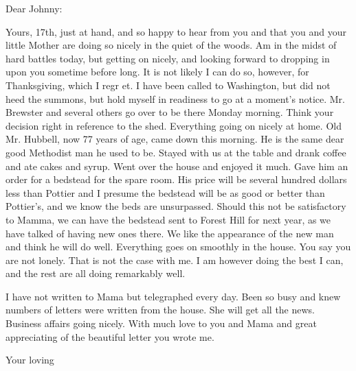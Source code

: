 \documentclass[11pt, oneside]{letter}   	%
\begin{document}
\signature{Father}

\address{26 Broadway \\New York}
\date{November 19, 1887}

\begin{letter}{}%

\opening{Dear Johnny:}
\setlength{\parindent}{0.5cm}

Yours, 17th, just at hand, and so happy to hear from you and that you and your little Mother are doing so nicely in the quiet of the woods. Am in the midst of hard battles today, but getting on nicely, and looking forward to dropping in upon you sometime before long. It is not likely I can do so, however, for Thanksgiving, which I regr et. I have been called to Washington, but did not heed the summons, but hold myself in readiness to go at a moment's notice. Mr. Brewster and several others go over to be there Monday morning. Think your decision right in reference to the shed. Everything going on nicely at home. Old Mr. Hubbell, now 77 years of age, came down this morning. He is the same dear good Methodist man he used to be. Stayed with us at the table and drank coffee and ate cakes and syrup. Went over the house and enjoyed it much. Gave him an order for a bedstead for the spare room. His price will be several hundred dollars less than Pottier and I presume the bedstead will be as good or better than Pottier's, and we know the beds are unsurpassed. Should this not be satisfactory to Mamma, we can have the bedstead sent to Forest Hill for next year, as we have talked of having new ones there. We like the appearance of the new man and think he will do well. Everything goes on smoothly in the house. You say you are not lonely. That is not the case with me. I am however doing the best I can, and the rest are all doing remarkably well.

I have not written to Mama but telegraphed every day. Been so busy and knew numbers of letters were written from the house. She will get all the news. Business affairs going nicely. With much love to you and Mama and great appreciating of the beautiful letter you wrote me.

\closing{Your loving}

\end{letter}

\end{document}
